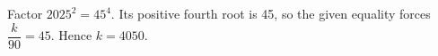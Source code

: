 Factor $2025^2=45^4$. Its positive fourth root is 45, so the given equality forces $\dfrac{k}{90}=45$. Hence $\boxed{k=4050}$.
